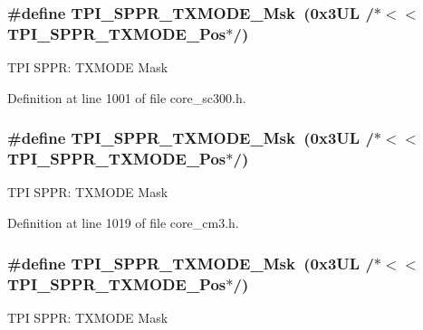 \subsubsection[{\texorpdfstring{T\+P\+I\+\_\+\+S\+P\+P\+R\+\_\+\+T\+X\+M\+O\+D\+E\+\_\+\+Msk}{TPI_SPPR_TXMODE_Msk}}]{\setlength{\rightskip}{0pt plus 5cm}\#define T\+P\+I\+\_\+\+S\+P\+P\+R\+\_\+\+T\+X\+M\+O\+D\+E\+\_\+\+Msk~(0x3\+U\+L /$\ast$$<$$<$ T\+P\+I\+\_\+\+S\+P\+P\+R\+\_\+\+T\+X\+M\+O\+D\+E\+\_\+\+Pos$\ast$/)}\hypertarget{group___c_m_s_i_s___t_p_i_gaca085c8a954393d70dbd7240bb02cc1f}{}\label{group___c_m_s_i_s___t_p_i_gaca085c8a954393d70dbd7240bb02cc1f}
T\+PI S\+P\+PR\+: T\+X\+M\+O\+DE Mask 

Definition at line 1001 of file core\+\_\+sc300.\+h.

\subsubsection[{\texorpdfstring{T\+P\+I\+\_\+\+S\+P\+P\+R\+\_\+\+T\+X\+M\+O\+D\+E\+\_\+\+Msk}{TPI_SPPR_TXMODE_Msk}}]{\setlength{\rightskip}{0pt plus 5cm}\#define T\+P\+I\+\_\+\+S\+P\+P\+R\+\_\+\+T\+X\+M\+O\+D\+E\+\_\+\+Msk~(0x3\+U\+L /$\ast$$<$$<$ T\+P\+I\+\_\+\+S\+P\+P\+R\+\_\+\+T\+X\+M\+O\+D\+E\+\_\+\+Pos$\ast$/)}\hypertarget{group___c_m_s_i_s___t_p_i_gaca085c8a954393d70dbd7240bb02cc1f}{}\label{group___c_m_s_i_s___t_p_i_gaca085c8a954393d70dbd7240bb02cc1f}
T\+PI S\+P\+PR\+: T\+X\+M\+O\+DE Mask 

Definition at line 1019 of file core\+\_\+cm3.\+h.

\subsubsection[{\texorpdfstring{T\+P\+I\+\_\+\+S\+P\+P\+R\+\_\+\+T\+X\+M\+O\+D\+E\+\_\+\+Msk}{TPI_SPPR_TXMODE_Msk}}]{\setlength{\rightskip}{0pt plus 5cm}\#define T\+P\+I\+\_\+\+S\+P\+P\+R\+\_\+\+T\+X\+M\+O\+D\+E\+\_\+\+Msk~(0x3\+U\+L /$\ast$$<$$<$ T\+P\+I\+\_\+\+S\+P\+P\+R\+\_\+\+T\+X\+M\+O\+D\+E\+\_\+\+Pos$\ast$/)}\hypertarget{group___c_m_s_i_s___t_p_i_gaca085c8a954393d70dbd7240bb02cc1f}{}\label{group___c_m_s_i_s___t_p_i_gaca085c8a954393d70dbd7240bb02cc1f}
T\+PI S\+P\+PR\+: T\+X\+M\+O\+DE Mask 

